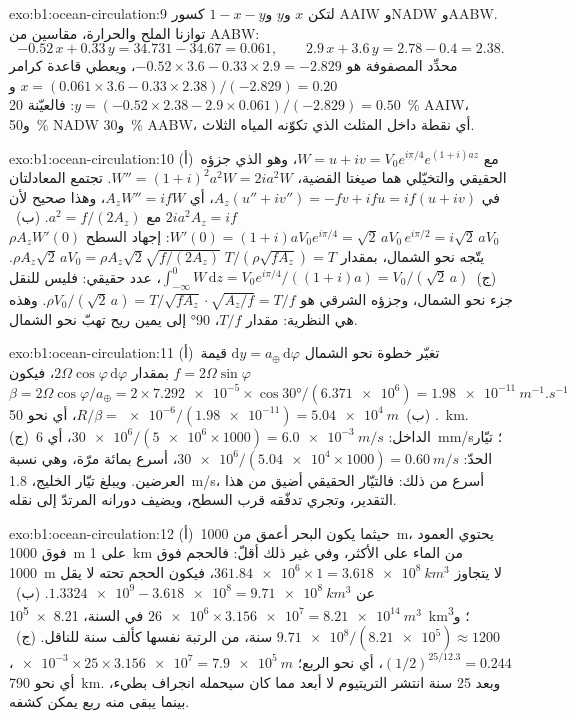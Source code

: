\begin{solution}{exo:b1:ocean-circulation:9}
لتكن $x$ و$y$ و$1 - x - y$ كسور AAIW وNADW وAABW. توازنا الملح والحرارة، مقاسين من AABW:
\[
  -0.52\,x + 0.33\,y = 34.731 - 34.67 = 0.061,\qquad
  2.9\,x + 3.6\,y = 2.78 - 0.4 = 2.38 .
\]
محدِّد المصفوفة هو $-0.52 \times 3.6 - 0.33 \times 2.9 = -2.829$، ويعطي قاعدة كرامر $x = (0.061 \times 3.6 - 0.33 \times 2.38)/(-2.829) = 0.20$ و$y = (-0.52
\times 2.38 - 2.9 \times 0.061)/(-2.829) = 0.50$: فالعيّنة \qty{20}{\percent} AAIW، و\qty{50}{\percent} NADW و\qty{30}{\percent} AABW، أي نقطة داخل المثلث الذي تكوّنه المياه الثلاث.
\end{solution}

\begin{solution}{exo:b1:ocean-circulation:10}
(أ)~مع $W = u + iv = V_0e^{i\pi/4}e^{(1+i)az}$، وهو الذي جزؤه الحقيقي والتخيّلي هما صيغتا القضية، $W'' = (1+i)^2a^2W = 2ia^2W$. تجتمع المعادلتان في $A_z(u'' + iv'') = -fv + ifu = if(u + iv)$، أي $A_zW'' = ifW$، وهذا صحيح لأن $2ia^2A_z = if$ مع $a^2 = f/(2A_z)$. (ب)~$W'(0) =
(1+i)aV_0e^{i\pi/4} = \sqrt2\,aV_0\,e^{i\pi/2} = i\sqrt2\,aV_0$: إجهاد السطح $\rho A_zW'(0)$ يتّجه نحو الشمال، بمقدار $\rho A_z\sqrt2\,aV_0 = \rho A_z\sqrt2
\sqrt{f/(2A_z)}\;T/(\rho\sqrt{fA_z}) = T$. (ج)~$\int_{-\infty}^0 W\,\mathrm dz =
V_0e^{i\pi/4}/((1+i)a) = V_0/(\sqrt2\,a)$، عدد حقيقي: فليس للنقل جزء نحو الشمال، وجزؤه الشرقي هو $\rho V_0/(\sqrt2\,a) =
T/\sqrt{fA_z}\cdot\sqrt{A_z/f} = T/f$. وهذه هي النظرية: مقدار $T/f$، \ang{90} إلى يمين ريح تهبّ نحو الشمال.
\end{solution}

\begin{solution}{exo:b1:ocean-circulation:11}
(أ)~تغيّر خطوة نحو الشمال $\mathrm dy = a_\oplus\,\mathrm d\varphi$ قيمة $f = 2\Omega
\sin\varphi$ بمقدار $2\Omega\cos\varphi\,\mathrm d\varphi$، فيكون $\beta = 2\Omega
\cos\varphi/a_\oplus = 2 \times \num{7.292e-5} \times \cos\ang{30}/(\num{6.371e6}) =
\qty{1.98e-11}{m^{-1}.s^{-1}}$. (ب)~$R/\beta = \num{e-6}/(\num{1.98e-11}) =
\qty{5.04e4}{m}$، أي نحو \qty{50}{km}. (ج)~الداخل: $\num{30e6}/(\num{5e6} \times
1000) = \qty{6.0e-3}{m/s}$، أي \qty{6}{mm/s}؛ تيّار الحدّ: $\num{30e6}/(\num{5.04e4}
\times 1000) = \qty{0.60}{m/s}$، أسرع بمائة مرّة، وهي نسبة العرضين. ويبلغ تيّار الخليج، \qty{1.8}{m/s}، أسرع من ذلك: فالتيّار الحقيقي أضيق من هذا التقدير، وتجري تدفّقه قرب السطح، ويضيف دورانه المرتدّ إلى نقله.
\end{solution}

\begin{solution}{exo:b1:ocean-circulation:12}
(أ)~حيثما يكون البحر أعمق من \qty{1000}{m}، يحتوي العمود فوق \qty{1000}{m} على \qty{1}{km} من الماء على الأكثر، وفي غير ذلك أقلّ: فالحجم فوق \qty{1000}{m} لا يتجاوز $\num{361.84e6} \times 1 = \qty{3.618e8}{km^3}$، فيكون الحجم تحته لا يقل عن $\num{1.3324e9} - \num{3.618e8} = \qty{9.71e8}{km^3}$. (ب)~$\num{26e6} \times \num{3.156e7} = \qty{8.21e14}{m^3}$ في السنة،
\qty{8.21e5}{km^3}؛ و$\num{9.71e8}/(\num{8.21e5}) \approx 1200$ سنة، من الرتبة نفسها كألف سنة للناقل. (ج)~$(1/2)^{25/12.3} = 0.244$، أي نحو الربع؛
$\num{e-3} \times 25 \times \num{3.156e7} = \qty{7.9e5}{m}$، أي نحو \qty{790}{km}. وبعد 25 سنة انتشر التريتيوم لا أبعد مما كان سيحمله انجراف بطيء، بينما يبقى منه ربع يمكن كشفه.
\end{solution}

